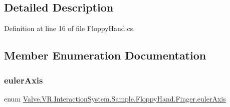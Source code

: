 \subsection{Detailed Description}


Definition at line 16 of file Floppy\+Hand.\+cs.



\subsection{Member Enumeration Documentation}
\mbox{\label{class_valve_1_1_v_r_1_1_interaction_system_1_1_sample_1_1_floppy_hand_1_1_finger_ab6442b559d46bdb7c1a046dcba1fa76d}} 
\subsubsection{\texorpdfstring{eulerAxis}{eulerAxis}}
{\footnotesize\ttfamily enum \mbox{\hyperlink{class_valve_1_1_v_r_1_1_interaction_system_1_1_sample_1_1_floppy_hand_1_1_finger_ab6442b559d46bdb7c1a046dcba1fa76d}{Valve.\+V\+R.\+Interaction\+System.\+Sample.\+Floppy\+Hand.\+Finger.\+euler\+Axis}}\hspace{0.3cm}{\ttfamily [strong]}}


